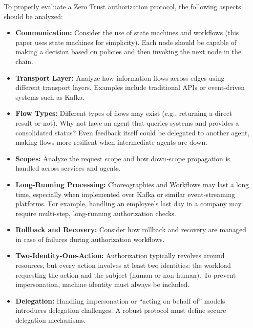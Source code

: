 To properly evaluate a Zero Trust authorization protocol, the following aspects should be analyzed:

\begin{itemize}
    \item \textbf{Communication:}  
    Consider the use of state machines and workflows (this paper uses state machines for simplicity).  
    Each node should be capable of making a decision based on policies and then invoking the next node in the chain.  

    \item \textbf{Transport Layer:}  
    Analyze how information flows across edges using different transport layers.  
    Examples include traditional APIs or event-driven systems such as Kafka.  

    \item \textbf{Flow Types:}  
    Different types of flows may exist (e.g., returning a direct result or not).  
    Why not have an agent that queries systems and provides a consolidated status?  
    Even feedback itself could be delegated to another agent, making flows more resilient when intermediate agents are down.  

    \item \textbf{Scopes:}  
    Analyze the request scope and how down-scope propagation is handled across services and agents.  

    \item \textbf{Long-Running Processing:}  
    Choreographies and Workflows may last a long time, especially when implemented over Kafka or similar event-streaming platforms.  
    For example, handling an employee’s last day in a company may require multi-step, long-running authorization checks.  

    \item \textbf{Rollback and Recovery:}  
    Consider how rollback and recovery are managed in case of failures during authorization workflows.  

    \item \textbf{Two-Identity-One-Action:}  
    Authorization typically revolves around resources, but every action involves at least two identities:  
    the workload requesting the action and the subject (human or non-human).  
    To prevent impersonation, machine identity must always be included.  

    \item \textbf{Delegation:}  
    Handling impersonation or “acting on behalf of” models introduces delegation challenges.  
    A robust protocol must define secure delegation mechanisms.  


\end{itemize}
